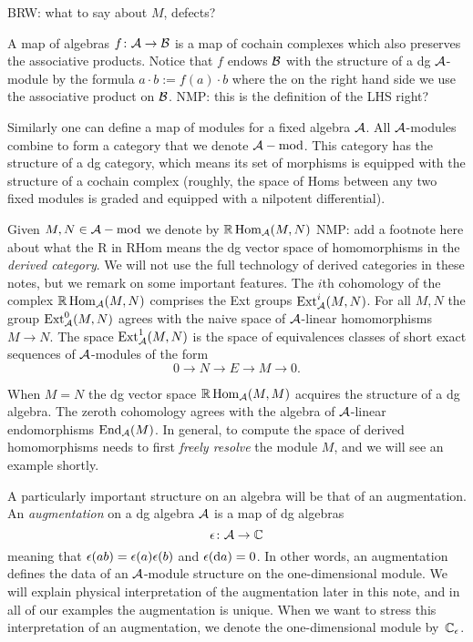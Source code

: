\documentclass[11pt]{amsart}
\def\brian#1{{\textcolor{blue!65!red}{BRW: {#1}}}}
\def\natalie#1{{\textcolor{green!65!black}{NMP: {#1}}}}
\begin{document}
\brian{what to say about $M$, defects?}
 
A map of algebras $f \colon \mathcal A \to \mathcal B$ is a map of cochain complexes which also preserves the associative products.
Notice that $f$ endows $\mathcal B$ with the structure of a dg $\mathcal A$-module by the formula $a \cdot b := f(a) \cdot b$ where the on the right hand side we use the associative product on $\mathcal B$.  \natalie{this is the definition of the LHS right?}

Similarly one can define a map of modules for a fixed algebra $\mathcal A$.  All $\mathcal A$-modules combine to form a category that we denote $\mathcal A-{\rm mod}$.
This category has the structure of a dg category, which means its set of morphisms is equipped with the structure of a cochain complex (roughly, the space of Homs between any two fixed modules is graded and equipped with a nilpotent differential). 

Given $M,N \in \mathcal A-{\rm mod}$ we denote by $\mathbb{R}\operatorname{Hom}_\mathcal A(M,N)$ \natalie{add a footnote here about what the R in RHom means} the dg vector space of homomorphisms in the {\em derived category}. 
We will not use the full technology of derived categories in these notes, but we remark on some important features. 
The $i$th cohomology of the complex $\mathbb{R}\operatorname{Hom}_{\mathcal A} (M,N)$ comprises the Ext groups ${\rm Ext}^i_{\mathcal A}(M,N)$. 
For all $M,N$ the group ${\rm Ext}^0_{\mathcal A}(M,N)$ agrees with the naive space of $\mathcal A$-linear homomorphisms $M \to N$. 
The space ${\rm Ext}^1_{\mathcal A}(M,N)$ is the space of equivalences classes of short exact sequences of $\mathcal A$-modules of the form
\[
0 \to N \to E \to M \to 0 .
\]

When $M = N$ the dg vector space $\mathbb{R}\operatorname{Hom}_\mathcal A(M,M)$ acquires the structure of a dg algebra.
The zeroth cohomology agrees with the algebra of $\mathcal A$-linear endomorphisms ${\rm End}_{\mathcal A}(M)$.  
In general, to compute the space of derived homomorphisms needs to first \textit{freely resolve} the module $M$, and we will see an example shortly.

A particularly important structure on an algebra will be that of an augmentation. 
An {\em augmentation} on a dg algebra $\mathcal A$ is a map of dg algebras 
\[
\epsilon \colon \mathcal A \to \mathbb C 
\]
meaning that $\epsilon (a b) = \epsilon(a) \epsilon(b)$ and $\epsilon ({\rm d} a) = 0$. 
In other words, an augmentation defines the data of an $\mathcal A$-module structure on the one-dimensional module. We will explain physical interpretation of the augmentation later in this note, and in all of our examples the augmentation is unique.
When we want to stress this interpretation of an augmentation, we denote the one-dimensional module by~$\mathbb C_\epsilon$.
\end{document}
